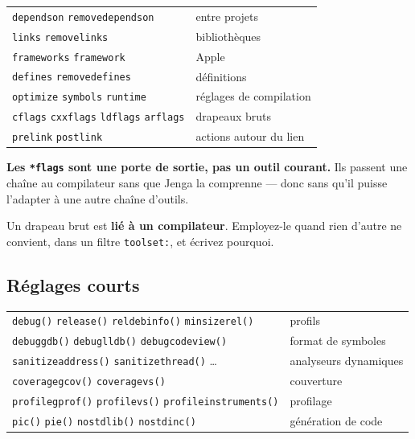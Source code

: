 \begin{center}
\begin{tabular}{@{}ll@{}}
\toprule
\texttt{dependson} \texttt{removedependson} & entre projets \\
\texttt{links} \texttt{removelinks} & bibliothèques \\
\texttt{frameworks} \texttt{framework} & Apple \\
\texttt{defines} \texttt{removedefines} & définitions \\
\texttt{optimize} \texttt{symbols} \texttt{runtime} & réglages de compilation \\
\texttt{cflags} \texttt{cxxflags} \texttt{ldflags} \texttt{arflags} & drapeaux bruts \\
\texttt{prelink} \texttt{postlink} & actions autour du lien \\
\bottomrule
\end{tabular}
\end{center}

\begin{nkretenir}
\textbf{Les \texttt{*flags} sont une porte de sortie, pas un outil courant.} Ils
passent une chaîne au compilateur sans que Jenga la comprenne --- donc sans qu'il
puisse l'adapter à une autre chaîne d'outils.

Un drapeau brut est \textbf{lié à un compilateur}. Employez-le quand rien
d'autre ne convient, dans un filtre \texttt{toolset:}, et écrivez pourquoi.
\end{nkretenir}

\subsection*{Réglages courts}

\begin{center}
\begin{tabular}{@{}ll@{}}
\toprule
\texttt{debug()} \texttt{release()} \texttt{reldebinfo()} \texttt{minsizerel()} & profils \\
\texttt{debuggdb()} \texttt{debuglldb()} \texttt{debugcodeview()} & format de symboles \\
\texttt{sanitizeaddress()} \texttt{sanitizethread()} \dots & analyseurs dynamiques \\
\texttt{coveragegcov()} \texttt{coveragevs()} & couverture \\
\texttt{profilegprof()} \texttt{profilevs()} \texttt{profileinstruments()} & profilage \\
\texttt{pic()} \texttt{pie()} \texttt{nostdlib()} \texttt{nostdinc()} & génération de code \\
\bottomrule
\end{tabular}
\end{center}

